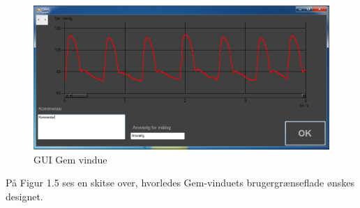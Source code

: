 \begin{figure}[H]
	\centering
	\includegraphics[width=1\textwidth]{Figurer/Gem}
	\caption{GUI  Gem vindue}
	\label{fig:GUI: 	Gem vindue}
\end{figure}
På Figur 1.5 ses en skitse over, hvorledes Gem-vinduets brugergrænseflade ønskes designet.







